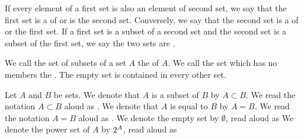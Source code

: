 
If every element of a first set is also an element of second set,
we say that the first set is a  of or is
 the second set.
Conversely, we say that the second set is a 
of or  the first set.
If a first set is a subset of a second set and the second set is a subset of
the first set, we say the two sets are .

We call the set of subsets of a set $A$ the  of $A$.
We call the set which has no members the .
The empty set is contained in every other set.

Let $A$ and $B$ be sets.
We denote that $A$ is a subset of $B$ by $A \subset B$.
We read the notation $A \subset B$ aloud as .
We denote that $A$ is equal to $B$ by $A = B$.
We read the notation $A = B$ aloud as .
We denote the empty set by $\emptyset$, read aloud as 
We denote the power set of $A$ by $2^{A}$, read aloud as 

\strats
